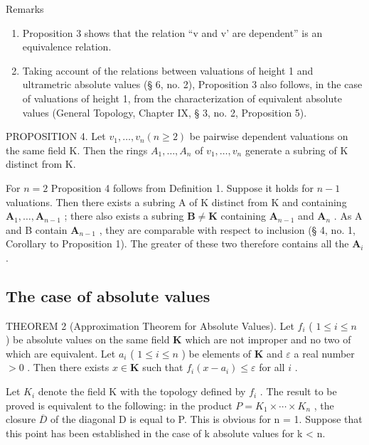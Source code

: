 Remarks

\begin{enumerate}
\def\labelenumi{(\arabic{enumi})}
\item
  Proposition 3 shows that the relation ``v and v' are dependent'' is an equivalence relation.
\item
  Taking account of the relations between valuations of height 1 and ultrametric absolute values (§ 6, no. 2), Proposition 3 also follows, in the case of valuations of height 1, from the characterization of equivalent absolute values (General Topology, Chapter IX, § 3, no. 2, Proposition 5).
\end{enumerate}

PROPOSITION 4. Let \(v_{1}, \ldots, v_{n} (n \geqslant 2)\) be pairwise dependent valuations on the same field K. Then the rings \(A_{1}, \ldots, A_{n}\) of \(v_{1}, \ldots, v_{n}\) generate a subring of K distinct from K.

For \(n = 2\) Proposition 4 follows from Definition 1. Suppose it holds for \(n - 1\) valuations. Then there exists a subring A of K distinct from K and containing \(\mathbf{A}_1, \ldots, \mathbf{A}_{n-1}\) ; there also exists a subring \(\mathbf{B} \neq \mathbf{K}\) containing \(\mathbf{A}_{n-1}\) and \(\mathbf{A}_n\) . As A and B contain \(\mathbf{A}_{n-1}\) , they are comparable with respect to inclusion (§ 4, no. 1, Corollary to Proposition 1). The greater of these two therefore contains all the \(\mathbf{A}_i\) .

\subsection{The case of absolute values}

THEOREM 2 (Approximation Theorem for Absolute Values). Let \(f_{i}\) ( \(1 \leqslant i \leqslant n\) ) be absolute values on the same field \(\mathbf{K}\) which are not improper and no two of which are equivalent. Let \(a_{i}\) ( \(1 \leqslant i \leqslant n\) ) be elements of \(\mathbf{K}\) and \(\varepsilon\) a real number \(>0\) . Then there exists \(x \in \mathbf{K}\) such that \(f_{i}(x - a_{i}) \leqslant \varepsilon\) for all \(i\) .

Let \(K_{i}\) denote the field K with the topology defined by \(f_{i}\) . The result to be proved is equivalent to the following: in the product \(P = K_{1} \times \cdots \times K_{n}\) , the closure \(\overline{D}\) of the diagonal D is equal to P. This is obvious for n = 1. Suppose that this point has been established in the case of k absolute values for k < n.

